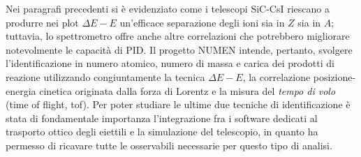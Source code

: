 
Nei paragrafi precedenti si è evidenziato come i telescopi SiC-CsI riescano a produrre nei plot $\Delta E - E$ un'efficace separazione degli ioni sia in $Z$ sia in $A$; tuttavia, lo spettrometro offre anche altre correlazioni che potrebbero migliorare notevolmente le capacità di PID. 
Il progetto NUMEN intende, pertanto, svolgere l'identificazione in numero atomico, numero di massa e carica dei prodotti di reazione utilizzando congiuntamente la tecnica $\Delta E - E$, la correlazione posizione-energia cinetica originata dalla forza di Lorentz e la misura del \emph{tempo di volo} (time of flight, tof).
Per poter studiare le ultime due tecniche di identificazione è stata di fondamentale importanza l'integrazione fra i software dedicati al trasporto ottico degli eiettili e la simulazione del telescopio, in quanto ha permesso di ricavare tutte le osservabili necessarie per questo tipo di analisi. 

